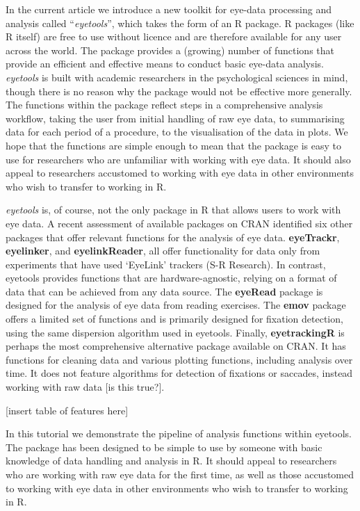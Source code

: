\documentclass[
  man,
  floatsintext,
  longtable,
  nolmodern,
  notxfonts,
  notimes,
  colorlinks=true,linkcolor=blue,citecolor=blue,urlcolor=blue]{apa7}
\begin{document}
In the current article we introduce a new toolkit for eye-data
processing and analysis called ``\emph{eyetools}'', which takes the form
of an R package. R packages (like R itself) are free to use without
licence and are therefore available for any user across the world. The
package provides a (growing) number of functions that provide an
efficient and effective means to conduct basic eye-data analysis.
\emph{eyetools} is built with academic researchers in the psychological
sciences in mind, though there is no reason why the package would not be
effective more generally. The functions within the package reflect steps
in a comprehensive analysis workflow, taking the user from initial
handling of raw eye data, to summarising data for each period of a
procedure, to the visualisation of the data in plots. We hope that the
functions are simple enough to mean that the package is easy to use for
researchers who are unfamiliar with working with eye data. It should
also appeal to researchers accustomed to working with eye data in other
environments who wish to transfer to working in R.

\emph{eyetools} is, of course, not the only package in R that allows
users to work with eye data. A recent assessment of available packages
on CRAN identified six other packages that offer relevant functions for
the analysis of eye data. \textbf{eyeTrackr}, \textbf{eyelinker}, and
\textbf{eyelinkReader}, all offer functionality for data only from
experiments that have used `EyeLink' trackers (S-R Research). In
contrast, eyetools provides functions that are hardware-agnostic,
relying on a format of data that can be achieved from any data source.
The \textbf{eyeRead} package is designed for the analysis of eye data
from reading exercises. The \textbf{emov} package offers a limited set
of functions and is primarily designed for fixation detection, using the
same dispersion algorithm used in eyetools. Finally,
\textbf{eyetrackingR} is perhaps the most comprehensive alternative
package available on CRAN. It has functions for cleaning data and
various plotting functions, including analysis over time. It does not
feature algorithms for detection of fixations or saccades, instead
working with raw data {[}is this true?{]}.

{[}insert table of features here{]}

In this tutorial we demonstrate the pipeline of analysis functions
within eyetools. The package has been designed to be simple to use by
someone with basic knowledge of data handling and analysis in R. It
should appeal to researchers who are working with raw eye data for the
first time, as well as those accustomed to working with eye data in
other environments who wish to transfer to working in R.
\end{document}
